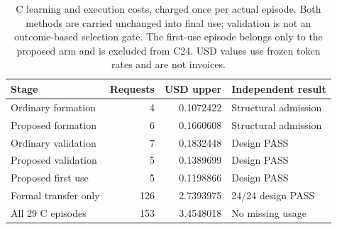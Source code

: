 \begin{table}[htbp]
\centering\small
\begin{tabular}{@{}lrrl@{}}
\toprule
Stage & Requests & USD upper & Independent result \\
\midrule
Ordinary formation & 4 & 0.1072422 & Structural admission \\
Proposed formation & 6 & 0.1660608 & Structural admission \\
Ordinary validation & 7 & 0.1832448 & Design PASS \\
Proposed validation & 5 & 0.1389699 & Design PASS \\
Proposed first use & 5 & 0.1198866 & Design PASS \\
\midrule
Formal transfer only & 126 & 2.7393975 & 24/24 design PASS \\
All 29 C episodes & 153 & 3.4548018 & No missing usage \\
\bottomrule
\end{tabular}
\caption{C learning and execution costs, charged once per actual episode. Both methods are carried unchanged into final use; validation is not an outcome-based selection gate. The first-use episode belongs only to the proposed arm and is excluded from C24. USD values use frozen token rates and are not invoices.}\label{tab:cstages}
\end{table}
